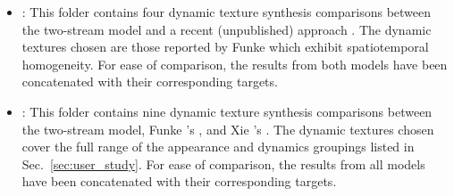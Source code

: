 \begin{itemize}
	\item {}: This folder contains four dynamic texture synthesis comparisons between the two-stream model and a recent (unpublished) approach \cite{funke2017}. The dynamic textures chosen are those reported by Funke \etal \cite{funke2017} which exhibit spatiotemporal homogeneity. For ease of comparison, the results from both models have been concatenated with their corresponding targets.
	\item {}: This folder contains nine dynamic texture synthesis comparisons between the two-stream model, Funke \etal's \cite{funke2017}, and Xie \etal's \cite{xie2017synthesizing}. The dynamic textures chosen cover the full range of the appearance and dynamics groupings listed in Sec.\ \ref{sec:user_study}. For ease of comparison, the results from all models have been concatenated with their corresponding targets.
\end{itemize}